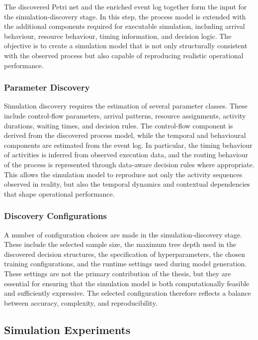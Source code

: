 The discovered Petri net and the enriched event log together form the input for the simulation-discovery stage. In this step, the process model is extended with the additional components required for executable simulation, including arrival behaviour, resource behaviour, timing information, and decision logic. The objective is to create a simulation model that is not only structurally consistent with the observed process but also capable of reproducing realistic operational performance.

\subsubsection{Parameter Discovery}

Simulation discovery requires the estimation of several parameter classes. These include control-flow parameters, arrival patterns, resource assignments, activity durations, waiting times, and decision rules. The control-flow component is derived from the discovered process model, while the temporal and behavioural components are estimated from the event log. In particular, the timing behaviour of activities is inferred from observed execution data, and the routing behaviour of the process is represented through data-aware decision rules where appropriate. This allows the simulation model to reproduce not only the activity sequences observed in reality, but also the temporal dynamics and contextual dependencies that shape operational performance.

\subsubsection{Discovery Configurations}

A number of configuration choices are made in the simulation-discovery stage. These include the selected sample size, the maximum tree depth used in the discovered decision structures, the specification of hyperparameters, the chosen training configurations, and the runtime settings used during model generation. These settings are not the primary contribution of the thesis, but they are essential for ensuring that the simulation model is both computationally feasible and sufficiently expressive. The selected configuration therefore reflects a balance between accuracy, complexity, and reproducibility.

\subsection{Simulation Experiments}

